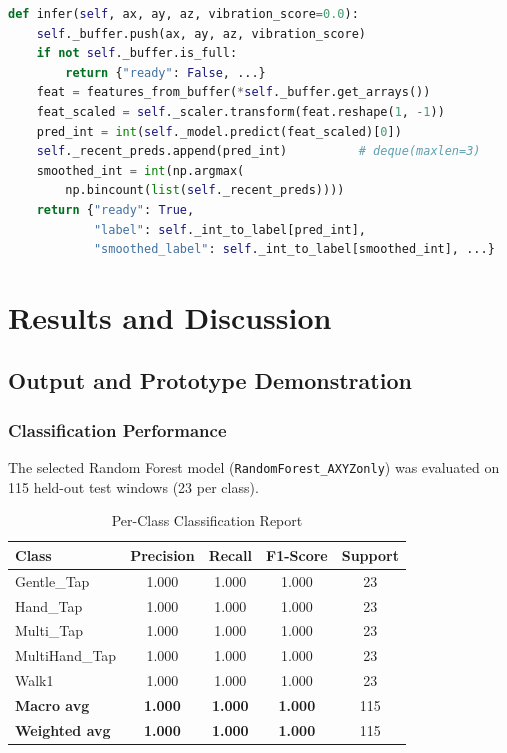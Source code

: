 \documentclass[12pt,a4paper]{report}
\begin{document}
\begin{lstlisting}[language=Python, caption={GVMSInference.infer() with majority-vote smoothing (inference.py)}, label={lst:infer}]
def infer(self, ax, ay, az, vibration_score=0.0):
    self._buffer.push(ax, ay, az, vibration_score)
    if not self._buffer.is_full:
        return {"ready": False, ...}
    feat = features_from_buffer(*self._buffer.get_arrays())
    feat_scaled = self._scaler.transform(feat.reshape(1, -1))
    pred_int = int(self._model.predict(feat_scaled)[0])
    self._recent_preds.append(pred_int)          # deque(maxlen=3)
    smoothed_int = int(np.argmax(
        np.bincount(list(self._recent_preds))))
    return {"ready": True,
            "label": self._int_to_label[pred_int],
            "smoothed_label": self._int_to_label[smoothed_int], ...}
\end{lstlisting}

\chapter{Results and Discussion}

\section{Output and Prototype Demonstration}

\subsection{Classification Performance}

The selected Random Forest model (\texttt{RandomForest\_AXYZonly}) was
evaluated on 115 held-out test windows (23 per class).

\begin{table}[H]
  \centering
  \caption{Per-Class Classification Report}
  \label{tab:clf_report}
  \begin{tabular}{lcccc}
    \toprule
    \textbf{Class} & \textbf{Precision} & \textbf{Recall} & \textbf{F1-Score} & \textbf{Support} \\
    \midrule
    Gentle\_Tap    & 1.000 & 1.000 & 1.000 & 23 \\
    Hand\_Tap      & 1.000 & 1.000 & 1.000 & 23 \\
    Multi\_Tap     & 1.000 & 1.000 & 1.000 & 23 \\
    MultiHand\_Tap & 1.000 & 1.000 & 1.000 & 23 \\
    Walk1          & 1.000 & 1.000 & 1.000 & 23 \\
    \midrule
    \textbf{Macro avg}    & \textbf{1.000} & \textbf{1.000} & \textbf{1.000} & 115 \\
    \textbf{Weighted avg} & \textbf{1.000} & \textbf{1.000} & \textbf{1.000} & 115 \\
    \bottomrule
  \end{tabular}
\end{table}
\end{document}
